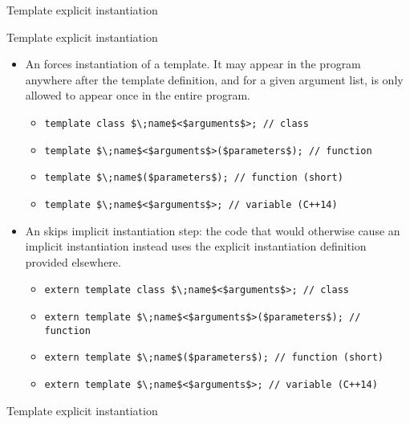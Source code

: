 \begin{frame}{Template explicit instantiation}{}
  \begin{block}{Template explicit instantiation}
    \begin{itemize}
    \item
      An  forces instantiation of a template. It may appear in the program anywhere after the template definition, and for a given argument list, is only allowed to appear once in the entire program.
      \begin{itemize}
        \item
          \lstinline[mathescape]!template class $\;name$<$arguments$>; // class!
        \item
          \lstinline[mathescape]!template $\;name$<$arguments$>($parameters$); // function!
        \item
          \lstinline[mathescape]!template $\;name$($parameters$); // function (short)!
        \item
          \lstinline[mathescape]!template $\;name$<$arguments$>; // variable (C++14)!
      \end{itemize}
    \item
      An  skips implicit instantiation step: the code that would otherwise cause an implicit instantiation instead uses the explicit instantiation definition provided elsewhere.
      \begin{itemize}
        \item
          \lstinline[mathescape]!extern template class $\;name$<$arguments$>; // class!
        \item
          \lstinline[mathescape]!extern template $\;name$<$arguments$>($parameters$); // function!
        \item
          \lstinline[mathescape]!extern template $\;name$($parameters$); // function (short)!
        \item
          \lstinline[mathescape]!extern template $\;name$<$arguments$>; // variable (C++14)!
      \end{itemize}
    \end{itemize}
  \end{block}
\end{frame}

\begin{frame}{Template explicit instantiation}{}
  \begin{example}
  \end{example}
\end{frame}

